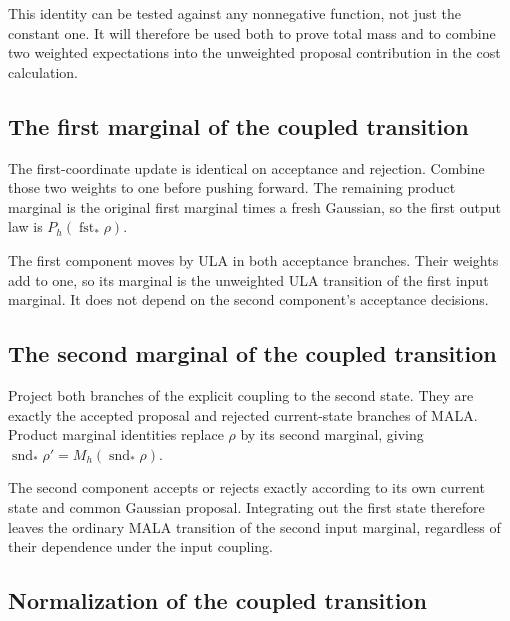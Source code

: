 \documentclass[11pt,a4paper]{report}
\begin{document}
This identity can be tested against any nonnegative function, not just the constant one. It will therefore be used both to prove total mass and to combine two weighted expectations into the unweighted proposal contribution in the cost calculation.

\subsection{\texorpdfstring{The first marginal of the coupled transition}{The first marginal of the coupled transition}}
\label{report-step-UnadjustedLangevin-MALACoupling-lean-11}


The first-coordinate update is identical on acceptance and rejection. Combine those two weights to one before pushing forward. The remaining product marginal is the original first marginal times a fresh Gaussian, so the first output law is \(P_h(\operatorname{fst}_*\rho)\).



The first component moves by ULA in both acceptance branches. Their weights add to one, so its marginal is the unweighted ULA transition of the first input marginal. It does not depend on the second component's acceptance decisions.

\subsection{\texorpdfstring{The second marginal of the coupled transition}{The second marginal of the coupled transition}}
\label{report-step-UnadjustedLangevin-MALACoupling-lean-12}


Project both branches of the explicit coupling to the second state. They are exactly the accepted proposal and rejected current-state branches of MALA. Product marginal identities replace \(\rho\) by its second marginal, giving \(\operatorname{snd}_*\rho'=M_h(\operatorname{snd}_*\rho)\).



The second component accepts or rejects exactly according to its own current state and common Gaussian proposal. Integrating out the first state therefore leaves the ordinary MALA transition of the second input marginal, regardless of their dependence under the input coupling.

\subsection{\texorpdfstring{Normalization of the coupled transition}{Normalization of the coupled transition}}
\label{report-step-UnadjustedLangevin-MALACoupling-lean-13}
\end{document}
